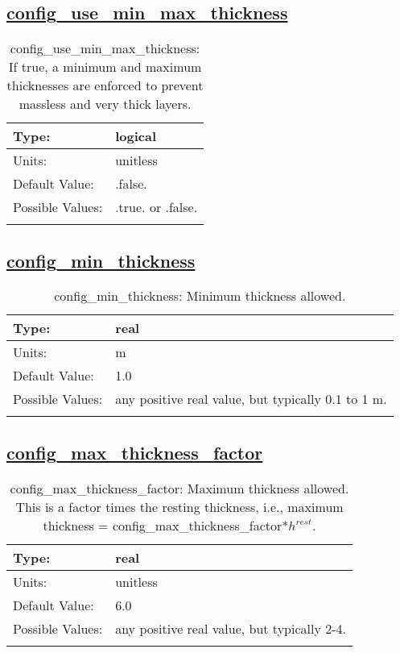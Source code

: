 \subsection[config\_use\_min\_max\_thickness]{\hyperref[sec:nm_tab_ALE_vertical_grid]{config\_use\_min\_max\_thickness}}
\label{subsec:nm_sec_config_use_min_max_thickness}
\begin{center}
\begin{longtable}{| p{2.0in} || p{4.0in} |}
    \hline
    Type: & logical \\
    \hline
    Units: & \si{unitless} \\
    \hline
    Default Value: & .false. \\
    \hline
    Possible Values: & .true. or .false. \\
    \hline
    \caption{config\_use\_min\_max\_thickness: If true, a minimum and maximum thicknesses are enforced to prevent massless and very thick layers.}
\end{longtable}
\end{center}
\subsection[config\_min\_thickness]{\hyperref[sec:nm_tab_ALE_vertical_grid]{config\_min\_thickness}}
\label{subsec:nm_sec_config_min_thickness}
\begin{center}
\begin{longtable}{| p{2.0in} || p{4.0in} |}
    \hline
    Type: & real \\
    \hline
    Units: & \si{m} \\
    \hline
    Default Value: & 1.0 \\
    \hline
    Possible Values: & any positive real value, but typically 0.1 to 1 m. \\
    \hline
    \caption{config\_min\_thickness: Minimum thickness allowed.}
\end{longtable}
\end{center}
\subsection[config\_max\_thickness\_factor]{\hyperref[sec:nm_tab_ALE_vertical_grid]{config\_max\_thickness\_factor}}
\label{subsec:nm_sec_config_max_thickness_factor}
\begin{center}
\begin{longtable}{| p{2.0in} || p{4.0in} |}
    \hline
    Type: & real \\
    \hline
    Units: & \si{unitless} \\
    \hline
    Default Value: & 6.0 \\
    \hline
    Possible Values: & any positive real value, but typically 2-4. \\
    \hline
    \caption{config\_max\_thickness\_factor: Maximum thickness allowed. This is a factor times the resting thickness, i.e., maximum thickness = config\_max\_thickness\_factor*$h^{rest}$.}
\end{longtable}
\end{center}
